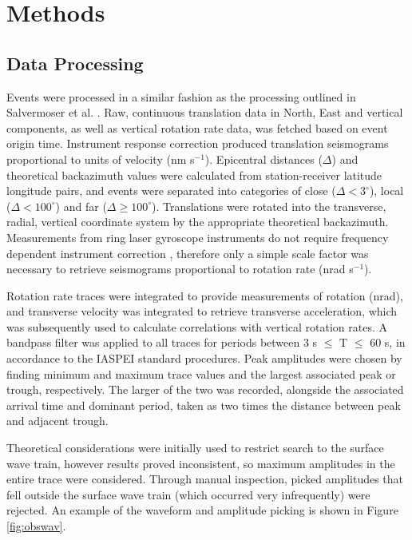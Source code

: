 \documentclass{gji}
\begin{document}
\section{Methods}
\subsection{Data Processing}\label{sec:dataproc}
Events were processed in a similar fashion as the processing outlined in Salvermoser et al. . 
Raw, continuous translation data in North, East and vertical components, as well as vertical rotation rate data, was fetched based on event origin time. Instrument response correction produced translation seismograms proportional to units of velocity (nm s$^{-1}$). Epicentral distances ($\Delta$) and theoretical backazimuth values were calculated from station-receiver latitude longitude pairs, and events were separated into categories of close ($\Delta < 3^\circ$), local ($\Delta <100^\circ$) and far ($\Delta \ge 100^\circ$). Translations were rotated into the transverse, radial, vertical coordinate system by the appropriate theoretical backazimuth. Measurements from ring laser gyroscope instruments do not require frequency dependent instrument correction \cite{schreiber2006ring},
therefore only a simple scale factor was necessary to retrieve seismograms proportional to rotation rate (nrad s$^{-1}$). 

Rotation rate traces were integrated to provide measurements of rotation (nrad), and transverse velocity was integrated to retrieve transverse acceleration, which was subsequently used to calculate correlations with vertical rotation rates.
A bandpass filter was applied to all traces for periods between 3 s $\le$ T $\le$ 60 s, in accordance to the IASPEI standard procedures. Peak amplitudes were chosen by finding minimum and maximum trace values and the largest associated peak or trough, respectively. The larger of the two was recorded, alongside the associated arrival time and dominant period, taken as two times the distance between peak and adjacent trough. 

Theoretical considerations were initially used to restrict search to the surface wave train, however results proved inconsistent, so maximum amplitudes in the entire trace were considered. Through manual inspection, picked amplitudes that fell outside the surface wave train (which occurred very infrequently) were rejected. An example of the waveform and amplitude picking is shown in Figure \ref{fig:obswav}.
\end{document}
